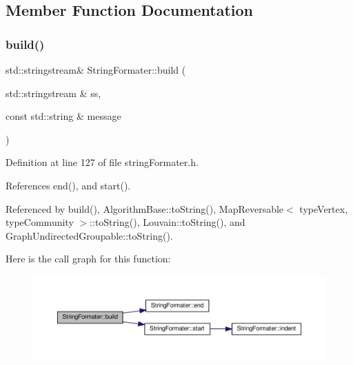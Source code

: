 \subsection{Member Function Documentation}
\mbox{\label{classStringFormater_a4cc86d5e84a9d5006d5eb61eafe68690}} 
\subsubsection{\texorpdfstring{build()}{build()}\hspace{0.1cm}{\footnotesize\ttfamily [1/2]}}
{\footnotesize\ttfamily std\+::stringstream\& String\+Formater\+::build (\begin{DoxyParamCaption}\item[{std\+::stringstream \&}]{ss,  }\item[{const std\+::string \&}]{message }\end{DoxyParamCaption})\hspace{0.3cm}{\ttfamily [inline]}}



Definition at line 127 of file string\+Formater.\+h.



References end(), and start().



Referenced by build(), Algorithm\+Base\+::to\+String(), Map\+Reversable$<$ type\+Vertex, type\+Community $>$\+::to\+String(), Louvain\+::to\+String(), and Graph\+Undirected\+Groupable\+::to\+String().

Here is the call graph for this function\+:
\nopagebreak
\begin{figure}[H]
\begin{center}
\leavevmode
\includegraphics[width=350pt]{classStringFormater_a4cc86d5e84a9d5006d5eb61eafe68690_cgraph}
\end{center}
\end{figure}
\mbox{\label{classStringFormater_a1772b0244f215c077dfd34248c9f0428}} 
